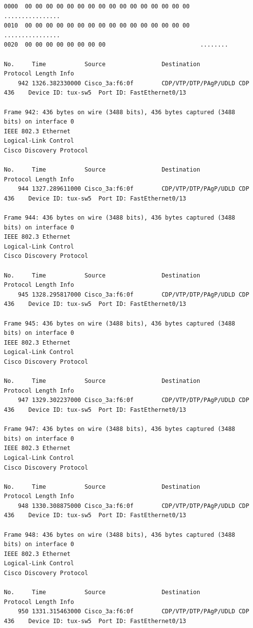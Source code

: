 \documentclass[a4paper,11pt]{article}
\begin{document}
\begin{lstlisting}
0000  00 00 00 00 00 00 00 00 00 00 00 00 00 00 00 00   ................
0010  00 00 00 00 00 00 00 00 00 00 00 00 00 00 00 00   ................
0020  00 00 00 00 00 00 00 00                           ........

No.     Time           Source                Destination           Protocol Length Info
    942 1326.382330000 Cisco_3a:f6:0f        CDP/VTP/DTP/PAgP/UDLD CDP      436    Device ID: tux-sw5  Port ID: FastEthernet0/13  

Frame 942: 436 bytes on wire (3488 bits), 436 bytes captured (3488 bits) on interface 0
IEEE 802.3 Ethernet 
Logical-Link Control
Cisco Discovery Protocol

No.     Time           Source                Destination           Protocol Length Info
    944 1327.289611000 Cisco_3a:f6:0f        CDP/VTP/DTP/PAgP/UDLD CDP      436    Device ID: tux-sw5  Port ID: FastEthernet0/13  

Frame 944: 436 bytes on wire (3488 bits), 436 bytes captured (3488 bits) on interface 0
IEEE 802.3 Ethernet 
Logical-Link Control
Cisco Discovery Protocol

No.     Time           Source                Destination           Protocol Length Info
    945 1328.295817000 Cisco_3a:f6:0f        CDP/VTP/DTP/PAgP/UDLD CDP      436    Device ID: tux-sw5  Port ID: FastEthernet0/13  

Frame 945: 436 bytes on wire (3488 bits), 436 bytes captured (3488 bits) on interface 0
IEEE 802.3 Ethernet 
Logical-Link Control
Cisco Discovery Protocol

No.     Time           Source                Destination           Protocol Length Info
    947 1329.302237000 Cisco_3a:f6:0f        CDP/VTP/DTP/PAgP/UDLD CDP      436    Device ID: tux-sw5  Port ID: FastEthernet0/13  

Frame 947: 436 bytes on wire (3488 bits), 436 bytes captured (3488 bits) on interface 0
IEEE 802.3 Ethernet 
Logical-Link Control
Cisco Discovery Protocol

No.     Time           Source                Destination           Protocol Length Info
    948 1330.308875000 Cisco_3a:f6:0f        CDP/VTP/DTP/PAgP/UDLD CDP      436    Device ID: tux-sw5  Port ID: FastEthernet0/13  

Frame 948: 436 bytes on wire (3488 bits), 436 bytes captured (3488 bits) on interface 0
IEEE 802.3 Ethernet 
Logical-Link Control
Cisco Discovery Protocol

No.     Time           Source                Destination           Protocol Length Info
    950 1331.315463000 Cisco_3a:f6:0f        CDP/VTP/DTP/PAgP/UDLD CDP      436    Device ID: tux-sw5  Port ID: FastEthernet0/13  


\end{lstlisting}
\end{document}
